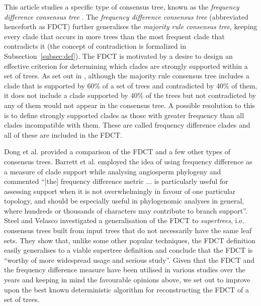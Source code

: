 \documentclass{article}
\begin{document}
    This article studies a specific type of consensus tree, known as the \textit{frequency difference consensus tree} \cite{goloboff2003improvements}. The \textit{frequency difference consensus tree} (abbreviated henceforth as FDCT) further generalises the \textit{majority rule consensus tree}, keeping every clade that occurs in more trees than the most frequent clade that contradicts it (the concept of contradiction is formalized in Subsection~\ref{subsec:def}). The FDCT is motivated by a desire to design an effective criterion for determining which clades are strongly supported within a set of trees. As set out in \cite{goloboff2003improvements}, although the majority rule consensus tree includes a clade that is supported by 60\% of a set of trees and contradicted by 40\% of them, it does not include a clade supported by 40\% of the trees but not contradicted by any of them would not appear in the consensus tree. A possible resolution to this is to define strongly supported clades as those with greater frequency than all clades incompatible with them. These are called frequency difference clades and all of these are included in the FDCT.

    Dong et al. \cite{dong2010majority} provided a comparison of the FDCT and a few other types of consensus trees. Barrett et al. \cite{barrett2013plastid} employed the idea of using frequency difference as a measure of clade support while analysing angiosperm phylogeny and commented ``[the] frequency difference metric ... is particularly useful for assessing support when it is not overwhelmingly in favour of one particular topology, and should be especially useful in phylogenomic analyses in general, where hundreds or thousands of characters may contribute to branch support''. Steel and Velasco \cite{steel2014axiomatic} investigated a generalisation of the FDCT to \textit{supertrees}, i.e. consensus trees built from input trees that do not necessarily have the same leaf sets. They show that, unlike some other popular techniques, the FDCT definition easily generalises to a viable supertree definition and conclude that the FDCT is ``worthy of more widespread usage and serious study''. Given that the FDCT and the frequency difference measure have been utilised in various studies over the years \cite{garcia2014testing,barrett2013plastid,molineri2010cladistic,molineri2013phylogeny,molineri2015phylogeny,lindqvist2006molecular,han2014new} and keeping in mind the favourable opinions above, we set out to improve upon the best known deterministic algorithm for reconstructing the FDCT of a set of trees.
\end{document}
